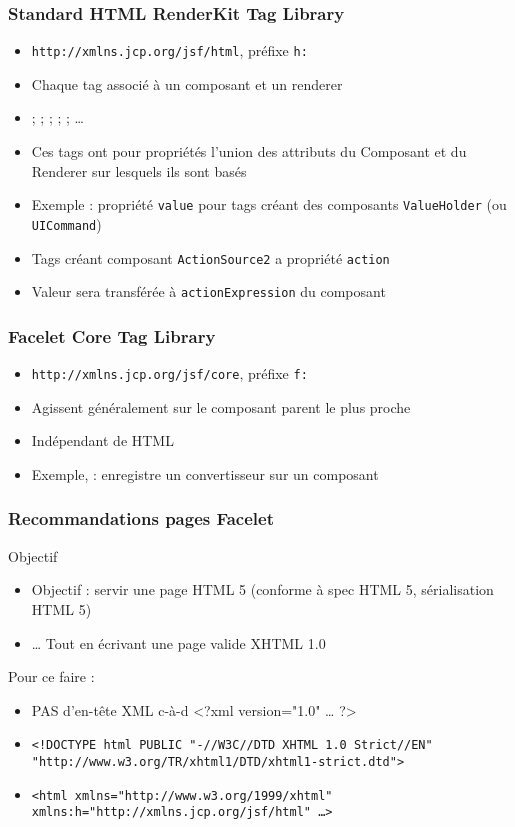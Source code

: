 \documentclass[english, french]{beamer}
\begin{document}
\begin{frame}
	\frametitle{Standard HTML RenderKit Tag Library}
	\begin{itemize}
		\item \texttt{http://xmlns.jcp.org/jsf/html}, préfixe \texttt{h:}
		\item Chaque tag associé à un composant et un renderer  %
		\item {} ;  ;  ;  ;  ; …
		\item Ces tags ont pour propriétés l’union des attributs du Composant et du Renderer sur lesquels ils sont basés
		\item Exemple : propriété \texttt{value} pour tags créant des composants \texttt{ValueHolder} (ou \texttt{UICommand})
		\item Tags créant composant \texttt{ActionSource2} a propriété \texttt{action}
		\item Valeur sera transférée à \texttt{actionExpression} du composant
	\end{itemize}
\end{frame}

\begin{frame}
	\frametitle{Facelet Core Tag Library}
	\begin{itemize}
		\item \texttt{http://xmlns.jcp.org/jsf/core}, préfixe \texttt{f:}
		\item Agissent {\tiny généralement} sur le composant parent le plus proche
		\item Indépendant de HTML
		\item Exemple,  : enregistre un convertisseur sur un composant
	\end{itemize}
\end{frame}

\begin{frame}
	\frametitle{Recommandations pages Facelet}
	\begin{block}{Objectif}
		\begin{itemize}
			\item Objectif : servir une page HTML 5 {\tiny (conforme à spec HTML 5, sérialisation HTML 5)}
			\item … Tout en écrivant une page valide XHTML 1.0
		\end{itemize}
	\end{block}
	Pour ce faire :
	\begin{itemize}
		\item PAS d’en-tête XML {\tiny c-à-d <?xml version="1.0" … ?>}
		\item \texttt{<!DOCTYPE html PUBLIC "-//W3C//DTD XHTML 1.0 Strict//EN" "http://www.w3.org/TR/xhtml1/DTD/xhtml1-strict.dtd">}
		\item \texttt{<html xmlns="http://www.w3.org/1999/xhtml" xmlns:h="http://xmlns.jcp.org/jsf/html" …>}
	\end{itemize}
\end{frame}
\end{document}
